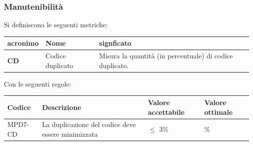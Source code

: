 \subsubsection{Manutenibilità}
Si definiscono le seguenti metriche:
\begin{table}[h!]
\centering
\def\arraystretch{1.5}
\begin{tabular}{ |m{2cm}|m{5.5cm}|m{6.5cm}| }
\hline
\rowcolor{lightgray!30}
\textbf{acronimo} & \textbf{Nome} & \textbf{signficato}\\
\hline
\textbf{CD} & Codice duplicato & Misura la quantità (in percentuale) di codice duplicato.\\
\hline
\end{tabular}
\end{table}
\par Con le seguenti regole:
\begin{table}[h!]
\centering
\def\arraystretch{1.5}
\begin{tabular}{ |>{\centering\arraybackslash}m{2.5cm}|>{\centering\arraybackslash}m{5.5cm}|>{\centering\arraybackslash}m{3cm}|>{\centering\arraybackslash}m{3cm}| }
\hline
\rowcolor{black}
\textbf{\color{white} Codice} & \textbf{\color{white} Descrizione} & \textbf{\color{white} Valore accettabile} & \textbf{\color{white} Valore ottimale}\\
\hline
MPD7-CD & La duplicazione del codice deve essere minimizzata & $\leq$ 3\% & 0\% \\
\hline
\end{tabular}
\end{table}

\newpage
